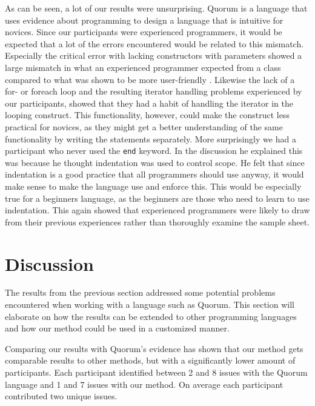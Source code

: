 \documentclass[10pt]{sigplanconf}
\begin{document}
As can be seen, a lot of our results were unsurprising.
Quorum is a language that uses evidence about programming to design a language that is intuitive for novices.
Since our participants were experienced programmers, it would be expected that a lot of the errors encountered would be related to this mismatch.
Especially the critical error with lacking constructors with parameters showed a large mismatch in what an experienced programmer expected from a class compared to what was shown to be more user-friendly \cite{ParamConstructors}.
Likewise the lack of a for- or foreach loop and the resulting iterator handling problems experienced by our participants, showed that they had a habit of handling the iterator in the looping construct.
This functionality, however, could make the construct less practical for novices, as they might get a better understanding of the same functionality by writing the statements separately.
More surprisingly we had a participant who never used the \lstinline!end! keyword.
In the discussion he explained this was because he thought indentation was used to control scope.
He felt that since indentation is a good practice that all programmers should use anyway, it would make sense to make the language use and enforce this.
This would be especially true for a beginners language, as the beginners are those who need to learn to use indentation.
This again showed that experienced programmers were likely to draw from their previous experiences rather than thoroughly examine the sample sheet.

\section{Discussion}
The results from the previous section addressed some potential problems encountered when working with a language such as Quorum. This section will elaborate on how the results can be extended to other programming languages and how our method could be used in a customized manner.

Comparing our results with Quorum's evidence has shown that our method gets comparable results to other methods, but with a significantly lower amount of participants. Each participant identified between 2 and 8 issues with the Quorum language and 1 and 7 issues with our method. On average each participant contributed two unique issues.
\end{document}
